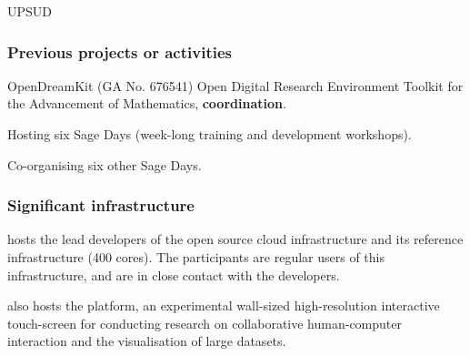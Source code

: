 \begin{sitedescription}{UPSUD}
\subsubsection*{Previous projects or activities}

\begin{compactenum}
\item OpenDreamKit (GA No. 676541) Open Digital Research Environment
  Toolkit for the Advancement of Mathematics, \textbf{coordination}.
\item Hosting six Sage Days (week-long training and development workshops).
\item Co-organising six other Sage Days.
\end{compactenum}

\subsubsection*{Significant infrastructure}

 hosts the lead developers of the open source
cloud infrastructure  and its reference
infrastructure (400 cores). The participants are regular users
of this infrastructure, and are in close contact with the developers.

 also hosts the  platform, an experimental wall-sized
high-resolution interactive touch-screen for conducting research on
collaborative human-computer interaction and the visualisation of
large datasets.

\end{sitedescription}



